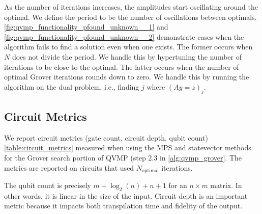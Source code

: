 \documentclass[11pt]{article}
\theoremstyle{definition}
\theoremstyle{remark}
\begin{document}
As the number of iterations increases, the amplitudes start oscillating around
the optimal.  We define the period to be the number of oscillations between
optimals.  \cref{fig:qvmp_functionality_pfound_unknown__1} and
\cref{fig:qvmp_functionality_pfound_unknown__2} demonstrate cases when the
algorithm fails to find a solution even when one exists.  The former occurs when
$N$ does not divide the period.  We handle this by hypertuning the number of
iterations to be close to the optimal.  The latter occurs when the number of
optimal Grover iterations rounds down to zero. We handle this by running
the algorithm on the dual problem, i.e., finding $j$ where $(Ay = z)_j$.

\subsection{Circuit Metrics} \label{sec:circuit_metrics}



We report circuit metrics (gate count, circuit depth, qubit count)
\cref{table:circuit_metrics} measured when using the MPS and statevector methods
for the Grover search portion of QVMP (step 2.3 in \cref{alg:qvmp_grover}. The
metrics are reported on circuits that used $N_{\text{optimal}}$ iterations.

The qubit count is precisely $m + \log_2(n) + n + 1$ for an $n \times m$ matrix.
In other words, it is linear in the size of the input. Circuit depth is an
important metric because it impacts both transpilation time and fidelity of the
output.
\end{document}
